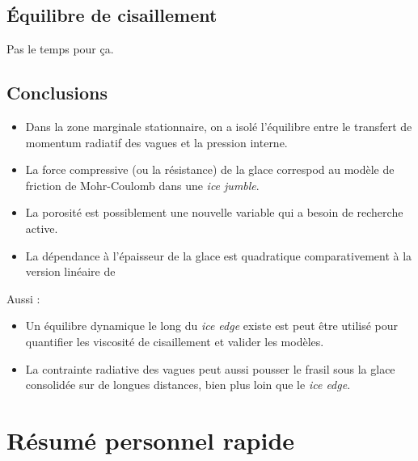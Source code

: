 \documentclass[10pt]{article}
\numberwithin{equation}{section}
\begin{document}
\subsection{Équilibre de cisaillement}
\label{sec:org7dd038c}

Pas le temps pour ça.
\subsection{Conclusions}
\label{sec:orgde9400d}

\begin{itemize}
\item Dans la zone marginale stationnaire, on a isolé l'équilibre entre le transfert de momentum radiatif des vagues et la pression interne.
\item La force compressive (ou la résistance) de la glace correspod au modèle de friction de Mohr-Coulomb dans une \emph{ice jumble}.
\item La porosité est possiblement une nouvelle variable qui a besoin de recherche active.
\item La dépendance à l'épaisseur de la glace est quadratique comparativement à la version linéaire de \Textcite{hibler1979dynamic}
\end{itemize}

Aussi :
\begin{itemize}
\item Un équilibre dynamique le long du \emph{ice edge} existe est peut être utilisé pour quantifier les viscosité de cisaillement et valider les modèles.
\item La contrainte radiative des vagues peut aussi pousser le frasil sous la glace consolidée sur de longues distances, bien plus loin que le \emph{ice edge}.
\end{itemize}
\section{Résumé personnel rapide}
\label{sec:org3fd94e2}
\end{document}
